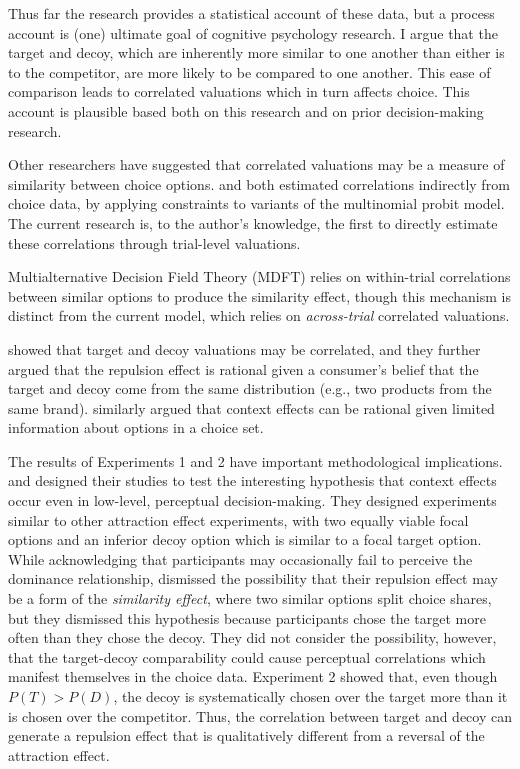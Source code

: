 Thus far the research provides a statistical account of these data, but a process account is (one) ultimate goal of cognitive psychology research. I argue that the target and decoy, which are inherently more similar to one another than either is to the competitor, are more likely to be compared to one another. This ease of comparison leads to correlated valuations which in turn affects choice. This account is plausible based both on this research and on prior decision-making research.

Other researchers have suggested that correlated valuations may be a measure of similarity between choice options. \textcite{kamakura1984predicting} and \textcite{natenzon2019random} both estimated correlations indirectly from choice data, by applying constraints to variants of the multinomial probit model. The current research is, to the author's knowledge, the first to directly estimate these correlations through trial-level valuations. 

Multialternative Decision Field Theory (MDFT) \parencite{roeMultialternativeDecisionField2001a} relies on within-trial correlations between similar options to produce the similarity effect, though this mechanism is distinct from the current model, which relies on \textit{across-trial} correlated valuations. 

\textcite{bhui2021rational} showed that target and decoy valuations may be correlated, and they further argued that the repulsion effect is rational given a consumer's belief that the target and decoy come from the same distribution (e.g., two products from the same brand). \textcite{bhui2024context} similarly argued that context effects can be rational given limited information about options in a choice set. 

The results of Experiments 1 and 2 have important methodological implications. \textcite{trueblood2013not} and \textcite{spektorWhenGoodLooks2018b} designed their studies to test the interesting hypothesis that context effects occur even in low-level, perceptual decision-making. They designed experiments similar to other attraction effect experiments, with two equally viable focal options and an inferior decoy option which is similar to a focal target option. While acknowledging that participants may occasionally fail to perceive the dominance relationship, \textcite{spektorWhenGoodLooks2018b} dismissed the possibility that their repulsion effect may be a form of the \textit{similarity effect}, where two similar options split choice shares, but they dismissed this hypothesis because participants chose the target more often than they chose the decoy. They did not consider the possibility, however, that the target-decoy comparability could cause perceptual correlations which manifest themselves in the choice data.  Experiment 2 showed that, even though $P(T)>P(D)$, the decoy is systematically chosen over the target more than it is chosen over the competitor. Thus, the correlation between target and decoy can generate a repulsion effect that is qualitatively different from a reversal of the attraction effect.

